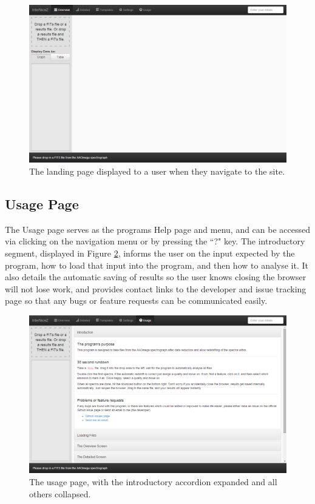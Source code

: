 \documentclass[titlesmallcaps, examinerscopy, copyrightpage]{uqthesis}
\begin{document}
\begin{figure}[ht!]
\includegraphics[width=1\textwidth]{images/empty.png} 
\centering
\caption{The landing page displayed to a user when they navigate to the site.}
\label{fig:empty}
\end{figure}



\subsection{Usage Page}

The Usage page serves as the programs Help page and menu, and can be accessed via clicking on the navigation menu or by pressing the ``?" key. The introductory segment, displayed in Figure \ref{fig:usage}, informs the user on the input expected by the program, how to load that input into the program, and then how to analyse it. It also details the automatic saving of results so the user knows closing the browser will not lose work, and provides contact links to the developer and issue tracking page so that any bugs or feature requests can be communicated easily.


\begin{figure}[ht!]
\includegraphics[width=1\textwidth]{images/usage.png} 
\centering
\caption{The usage page, with the introductory accordion expanded and all others collapsed.}
\label{fig:usage}
\end{figure}
\end{document}
